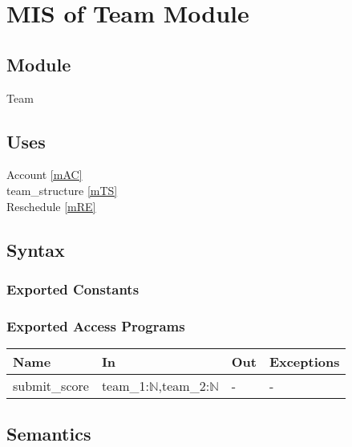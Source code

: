 \documentclass[12pt, titlepage]{article}
\begin{document}
\newpage

\section{MIS of Team Module} \label{mTE}



\subsection{Module}

Team

\subsection{Uses}

Account \ref{mAC} \\
team\_structure \ref{mTS} \\
Reschedule \ref{mRE}

\subsection{Syntax}

\subsubsection{Exported Constants}

\subsubsection{Exported Access Programs}

\begin{center}
\begin{tabular}{p{3cm} p{7cm} p{2cm} p{2cm}}
\hline
\textbf{Name} & \textbf{In} & \textbf{Out} & \textbf{Exceptions} \\
\hline
submit\_score & team\_1:$\mathbb{N}$,team\_2:$\mathbb{N}$ & - & - \\
\hline
\end{tabular}
\end{center}

\subsection{Semantics}
\end{document}

